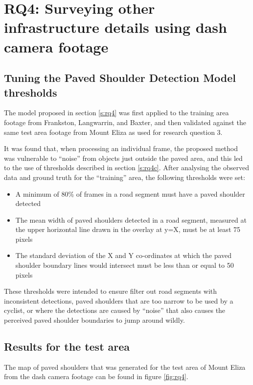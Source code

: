 \documentclass[11pt,twoside]{report}
\begin{document}
\section{RQ4: Surveying other infrastructure details using dash camera footage}
\label{results:rq4}

\subsection{Tuning the Paved Shoulder Detection Model thresholds}

The model proposed in section \ref{s:rq4} was first applied to the training area footage from Frankston, Langwarrin, and Baxter, and then validated against the same test area footage from Mount Eliza as used for research question 3.

It was found that, when processing an individual frame, the proposed method was vulnerable to ``noise'' from objects just outside the paved area, and this led to the use of thresholds described in section \ref{s:rq4c}.  After analysing the observed data and ground truth for the ``training'' area, the following thresholds were set:

\begin{itemize}
\item{A minimum of 80\% of frames in a road segment must have a paved shoulder detected}
\item{The mean width of paved shoulders detected in a road segment, measured at the upper horizontal line drawn in the overlay at y=X, must be at least 75 pixels}
\item{The standard deviation of the X and Y co-ordinates at which the paved shoulder boundary lines would intersect must be less than or equal to 50 pixels}
\end{itemize}

These thresholds were intended to ensure filter out road segments with inconsistent detections, paved shoulders that are too narrow to be used by a cyclist, or where the detections are caused by ``noise'' that also causes the perceived paved shoulder boundaries to jump around wildly.

\subsection{Results for the test area}

The map of paved shoulders that was generated for the test area of Mount Eliza from the dash camera footage can be found in figure \ref{fig:rq4}.
\end{document}
